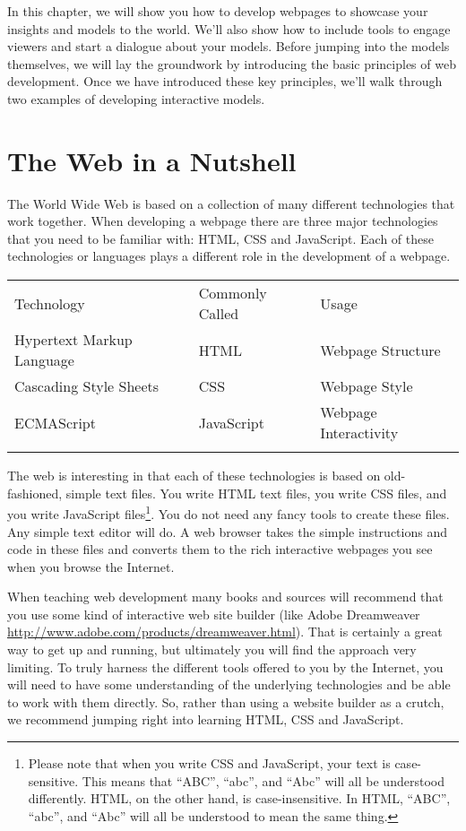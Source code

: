 \documentclass[]{memoir}
\begin{document}
In this chapter, we will show you how to develop webpages to showcase
your insights and models to the world. We'll also show how to include
tools to engage viewers and start a dialogue about your models. Before
jumping into the models themselves, we will lay the groundwork by
introducing the basic principles of web development. Once we have
introduced these key principles, we'll walk through two examples of
developing interactive models.

\section{The Web in a Nutshell}

The World Wide Web is based on a collection of many different
technologies that work together. When developing a webpage there are
three major technologies that you need to be familiar with: HTML, CSS
and JavaScript. Each of these technologies or languages plays a
different role in the development of a webpage.

\begin{longtable}[c]{@{}lll@{}}
\hline\noalign{\medskip}
Technology & Commonly Called & Usage
\\\noalign{\medskip}
\hline\noalign{\medskip}
Hypertext Markup Language & HTML & Webpage Structure
\\\noalign{\medskip}
Cascading Style Sheets & CSS & Webpage Style
\\\noalign{\medskip}
ECMAScript & JavaScript & Webpage Interactivity
\\\noalign{\medskip}
\hline
\end{longtable}

The web is interesting in that each of these technologies is based on
old-fashioned, simple text files. You write HTML text files, you write
CSS files, and you write JavaScript files\footnote{Please note that when
  you write CSS and JavaScript, your text is case-sensitive. This means
  that ``ABC'', ``abc'', and ``Abc'' will all be understood differently.
  HTML, on the other hand, is case-insensitive. In HTML, ``ABC'',
  ``abc'', and ``Abc'' will all be understood to mean the same thing.}.
You do not need any fancy tools to create these files. Any simple text
editor will do. A web browser takes the simple instructions and code in
these files and converts them to the rich interactive webpages you see
when you browse the Internet.

When teaching web development many books and sources will recommend that
you use some kind of interactive web site builder (like Adobe
Dreamweaver \url{http://www.adobe.com/products/dreamweaver.html}). That
is certainly a great way to get up and running, but ultimately you will
find the approach very limiting. To truly harness the different tools
offered to you by the Internet, you will need to have some understanding
of the underlying technologies and be able to work with them directly.
So, rather than using a website builder as a crutch, we recommend
jumping right into learning HTML, CSS and JavaScript.
\end{document}
